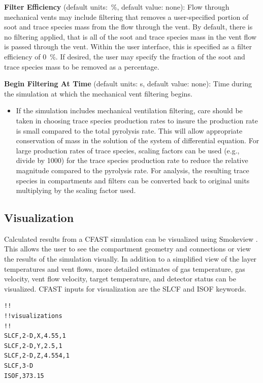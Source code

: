 \textbf{Filter Efficiency} (default units:~\%, default value: none): Flow through mechanical vents may include filtering that removes a user-specified portion of soot and trace species mass from the flow through the vent.  By default, there is no filtering applied, that is all of the soot and trace species mass in the vent flow is passed through the vent. Within the user interface, this is specified as a filter efficiency of 0~\%.  If desired, the user may specify the fraction of the soot and trace species mass to be removed as a percentage.

\textbf{Begin Filtering At Time} (default units: s, default value: none): Time during the simulation at which the mechanical vent filtering begins.

\begin{itemize}
\item If the simulation includes mechanical ventilation filtering, care should be taken in choosing trace species production rates to insure the production rate is small compared to the total pyrolysis rate.  This will allow appropriate conservation of mass in the solution of the system of differential equation.  For large production rates of trace species, scaling factors can be used (e.g., divide by 1000) for the trace species production rate to reduce the relative magnitude compared to the pyrolysis rate.  For analysis, the resulting trace species in compartments and filters can be converted back to original units multiplying by the scaling factor used.
\end{itemize}

\subsection{Visualization}

Calculated results from a CFAST simulation can be visualized using Smokeview \cite{Smokeview_Users_Guide_6}. This allows the user to see the compartment geometry and connections
or view the results of the simulation visually. In addition to a simplified view of the layer temperatures and vent flows, more detailed estimates of gas temperature, gas velocity, vent flow velocity, target temperature, and detector status can be visualized. CFAST inputs for visualization are the SLCF and ISOF keywords.

\begin{lstlisting}
!!
!!visualizations
!!
SLCF,2-D,X,4.55,1
SLCF,2-D,Y,2.5,1
SLCF,2-D,Z,4.554,1
SLCF,3-D
ISOF,373.15
\end{lstlisting}


